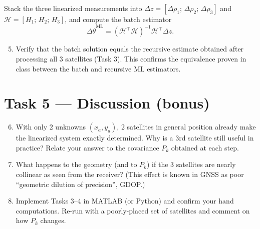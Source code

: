 \documentclass[11pt]{article}
\begin{document}
Stack the three linearized measurements into $\Delta z = [\Delta\rho_1;\, \Delta\rho_2;\, \Delta\rho_3]$
and $\mathcal{H} = [H_1;\, H_2;\, H_3]$, and compute the batch estimator
\begin{equation}
  \hat{\Delta\theta}^{\text{ML}} = (\mathcal{H}^\top \mathcal{H})^{-1}\mathcal{H}^\top \Delta z.
\end{equation}

\begin{enumerate}[leftmargin=2.2em]
\setcounter{enumi}{4}
\item Verify that the batch solution equals the recursive estimate obtained after processing all 3
      satellites (Task 3). This confirms the equivalence proven in class between the batch and recursive
      ML estimators.
\end{enumerate}

\section{Task 5 --- Discussion (bonus)}

\begin{enumerate}[leftmargin=2.2em]
\setcounter{enumi}{5}
\item With only 2 unknowns $(x_a,y_a)$, 2 satellites in general position already make the linearized
      system exactly determined. Why is a 3rd satellite still useful in practice? Relate your answer to
      the covariance $P_k$ obtained at each step.
\item What happens to the geometry (and to $P_k$) if the 3 satellites are nearly collinear as seen from
      the receiver? (This effect is known in GNSS as poor ``geometric dilution of precision'', GDOP.)
\item Implement Tasks 3--4 in MATLAB (or Python) and confirm your hand computations. Re-run with a
      poorly-placed set of satellites and comment on how $P_k$ changes.
\end{enumerate}

\vspace{0.5em}
\noindent\hrulefill

\vspace{0.3em}
\end{document}
